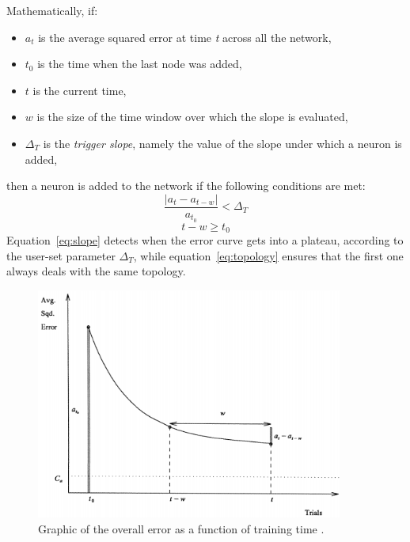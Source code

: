 \documentclass[11pt,a4paper]{report}
\begin{document}
				Mathematically, if:
				\begin{itemize}
					\item $a_t$ is the average squared error at time \emph{t} across all the network,
					\item $t_0$ is the time when the last node was added,
					\item $t$ is the current time,
					\item $w$ is the size of the time window over which the slope is evaluated,
					\item $\Delta_T$ is the \emph{trigger slope}, namely the value of the slope under which a neuron is added,
				\end{itemize}
				then a neuron is added to the network if the following conditions are met:
				\begin{equation}
					\label{eq:slope}
					\frac{\left| a_t - a_{t-w} \right|}{a_{t_0}} < \Delta_T
				\end{equation}
				\begin{equation}
					\label{eq:topology}
					t - w \geq t_0
				\end{equation}
				Equation~\ref{eq:slope} detects when the error curve gets into a plateau, according to the user-set parameter $\Delta_T$, while equation~\ref{eq:topology} ensures that the first one always deals with the same topology.
				
				\begin{figure}[h]
					\centering
					\includegraphics[width=0.9\textwidth]{error}
					\caption{Graphic of the overall error as a function of training time \cite{ash1989dynamic}.}
					\label{fig:error}
				\end{figure}
				
\end{document}
